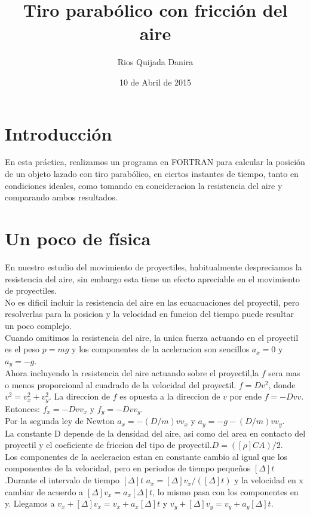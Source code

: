 \documentclass[10pt]{article}
\title{Tiro parabólico con fricción del aire}
\author{Rios Quijada Danira}
\date{10 de Abril de 2015}
\begin{document}
\maketitle
\section{Introducción}
En esta práctica, realizamos un programa en FORTRAN para calcular la posición de un objeto lazado con tiro parabólico, en ciertos instantes de tiempo, tanto en condiciones ideales, como tomando en concideracion la resistencia del aire y comparando ambos resultados.
\space
\space
\space
\space
\section{Un poco de física}
En nuestro estudio del movimiento de proyectiles, habitualmente despreciamos la resistencia del aire, sin embargo esta tiene un efecto apreciable en el movimiento de proyectiles.\\

No es dificil incluir la resistencia del aire en las ecuacuaciones del proyectil, pero resolverlas para la posicion y la velocidad en funcion del tiempo puede resultar un poco complejo.\\

Cuando omitimos la resistencia del aire, la unica fuerza actuando en el proyectil es el peso $p=mg$ y los componentes de la aceleracion son sencillos $a_{x}=0$ y $a_{y}=-g$.\\

Ahora incluyendo la resistencia del aire actuando sobre el proyectil,la $f$ sera mas o menos proporcional  al cuadrado de la velocidad del proyectil. $f=Dv^2$, donde $v^2=v_{x}^2+v_{y}^2$. La direccion de $f$ es opuesta a la direccion de $v$ por ende $f=-Dvv$. Entonces: $f_{x}=-Dvv_{x}$ y $f_{y}=-Dvv_{y}$.\\

Por la segunda ley de Newton $a_{x}=-(D/m)vv_{x}$ y $a_{y}=-g-(D/m)vv_{y}$.\\

La constante D depende de la densidad del aire, asi como del area en contacto del proyectil y el coeficiente de friccion del tipo de proyectil.$D=([\rho]CA)/2$.\\

Los componentes de la aceleracion estan en constante cambio al igual que los componentes de la velocidad, pero en periodos de tiempo pequeños $[\Delta]t$.Durante el intervalo de tiempo $[\Delta]t$ $a_{x}=[\Delta]v_{x}/([\Delta]t)$ y la velocidad en x cambiar de acuerdo a $[\Delta]v_{x}=a_{x}[\Delta]t$, lo mismo pasa con los componentes en y. Llegamos a  $v_{x}+[\Delta]v_{x}=v_{x}+a_{x}[\Delta]t$ y $v_{y}+[\Delta]v_{y}=v_{y}+a_{y}[\Delta]t$.\\
\end{document}
